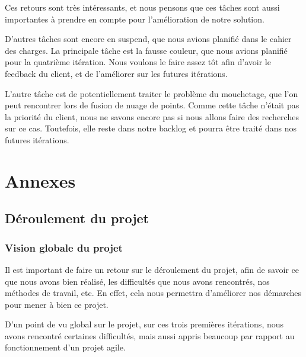 \documentclass[12pt,titlepage,french]{article}
\begin{document}
Ces retours sont très intéressants, et nous pensons que ces tâches sont aussi importantes à prendre en compte pour l'amélioration de notre solution. \newline

D'autres tâches sont encore en suspend, que nous avions planifié dans le cahier des charges. La principale tâche est la fausse couleur, que nous avions planifié pour la quatrième itération. Nous voulons le faire assez tôt afin d'avoir le feedback du client, et de l'améliorer sur les futures itérations.

L'autre tâche est de potentiellement traiter le problème du mouchetage, que l'on peut rencontrer lors de fusion de nuage de points. Comme cette tâche n'était pas la priorité du client, nous ne savons encore pas si nous allons faire des recherches sur ce cas. Toutefois, elle reste dans notre backlog et pourra être traité dans nos futures itérations.

\section{Annexes}

\subsection{Déroulement du projet}

\subsubsection{Vision globale du projet}

Il est important de faire un retour sur le déroulement du projet, afin de savoir ce que nous avons bien réalisé, les difficultés que nous avons rencontrés, nos méthodes de travail, etc. En effet, cela nous permettra d'améliorer nos démarches pour mener à bien ce projet. \newline

D'un point de vu global sur le projet, sur ces trois premières itérations, nous avons rencontré certaines difficultés, mais aussi appris beaucoup par rapport au fonctionnement d'un projet agile.
\end{document}
